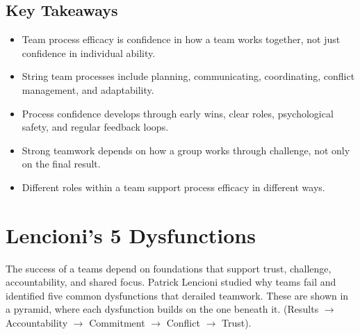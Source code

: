 \documentclass{report}
\begin{document}
	\subsection{Key Takeaways}

		\begin{itemize}
			\item Team process efficacy is confidence in how a team works together, not just confidence in individual ability.
			\item String team processes include planning, communicating, coordinating, conflict management, and adaptability.
			\item Process confidence develops through early wins, clear roles, psychological safety, and regular feedback loops.
			\item Strong teamwork depends on how a group works through challenge, not only on the final result.
			\item Different roles within a team support process efficacy in different ways.
		\end{itemize}

	\section{Lencioni's 5 Dysfunctions}

		The success of a teams depend on foundations that support trust, challenge, accountability, and shared focus. Patrick Lencioni studied why teams fail and identified five common dysfunctions that derailed teamwork. These are shown in a pyramid, where each dysfunction builds on the one beneath it. (Results $\rightarrow$ Accountability $\rightarrow$ Commitment $\rightarrow$ Conflict $\rightarrow$ Trust).
\end{document}
